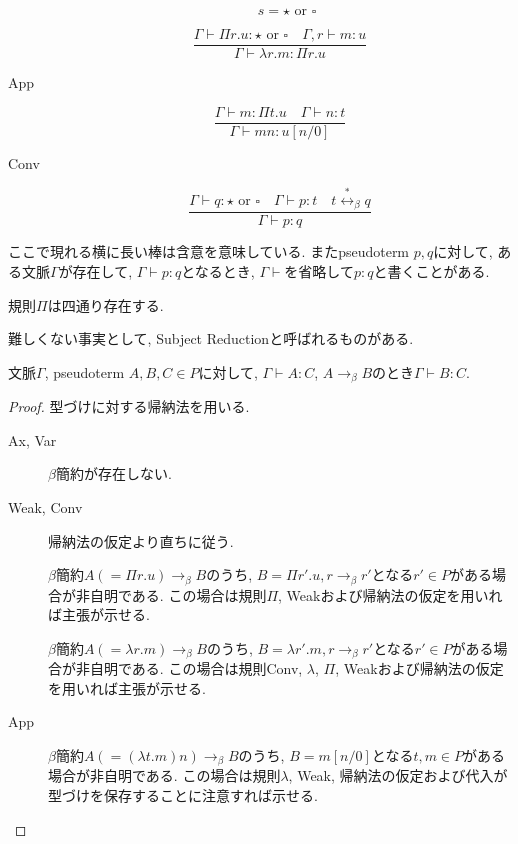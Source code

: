 \documentclass[12pt]{ltjsarticle}
\begin{document}
\begin{defn}
\begin{description}
\[             \quad
             s = {\star} \text{ or } {\square} \]
  \item[\lambda] \[ \frac{\Gamma \vdash \Pi r. u {\colon} {\star} \text{ or } {\square} \quad \Gamma, r \vdash m : u}{\Gamma \vdash \lambda r. m {\colon} \Pi r. u} \]
  \item[App] \[ \frac{\Gamma \vdash m : \Pi t. u \quad \Gamma \vdash n : t}{\Gamma \vdash m n {\colon} u[n/0]} \]
  \item[Conv] \[\frac{\Gamma \vdash q {\colon} {\star} \text{ or } {\square} \quad \Gamma \vdash p {\colon} t \quad t \overset{*}{\leftrightarrow}_\beta q}{\Gamma \vdash p {\colon} q} \]
 \end{description}
 ここで現れる横に長い棒は含意を意味している. またpseudoterm $p, q$に対して, ある文脈$\Gamma$が存在して, $\Gamma \vdash p : q$となるとき, $\Gamma \vdash$を省略して$p : q$と書くことがある.
\end{defn}

\begin{rem}
 規則$\Pi$は四通り存在する.
\end{rem}


難しくない事実として, Subject Reductionと呼ばれるものがある.

\begin{thm}
 文脈$\Gamma$, pseudoterm $A, B, C \in P$に対して, $\Gamma \vdash A \colon C$, $A \rightarrow_\beta B$のとき$\Gamma \vdash B \colon C$.
\end{thm}
\begin{proof}
 型づけに対する帰納法を用いる.
 \begin{description}
  \item[Ax, Var] $\beta$簡約が存在しない.
  \item[Weak, Conv] 帰納法の仮定より直ちに従う.
  \item[\Pi] $\beta$簡約$A (= \Pi r. u) \rightarrow_\beta B$のうち, $B = \Pi r'. u, r \rightarrow_\beta r'$となる$r' \in P$がある場合が非自明である. この場合は規則$\Pi$, Weakおよび帰納法の仮定を用いれば主張が示せる.
  \item[\lambda] $\beta$簡約$A (= \lambda r. m) \rightarrow_\beta B$のうち, $B = \lambda r'. m, r \rightarrow_\beta r'$となる$r' \in P$がある場合が非自明である. この場合は規則Conv, $\lambda$, $\Pi$, Weakおよび帰納法の仮定を用いれば主張が示せる.
  \item[App] $\beta$簡約$A (= (\lambda t. m) n) \rightarrow_\beta B$のうち, $B = m[n/0]$となる$t, m \in P$がある場合が非自明である. この場合は規則$\lambda$, Weak, 帰納法の仮定および代入が型づけを保存することに注意すれば示せる.
 \end{description}
\end{proof}
\end{document}
